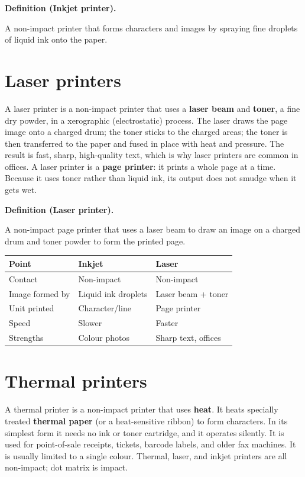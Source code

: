 \documentclass[11pt]{article}
\newenvironment{definitionbox}[1]{%
  \par\noindent\textbf{Definition (#1).}\ \itshape
}{\par\vspace{0.3em}}
\begin{document}
\begin{definitionbox}{Inkjet printer}
A non-impact printer that forms characters and images by spraying fine
droplets of liquid ink onto the paper.
\end{definitionbox}

\section{Laser printers}
A laser printer is a non-impact printer that uses a \textbf{laser beam} and
\textbf{toner}, a fine dry powder, in a xerographic (electrostatic) process.
The laser draws the page image onto a charged drum; the toner sticks to the
charged areas; the toner is then transferred to the paper and fused in place
with heat and pressure. The result is fast, sharp, high-quality text, which
is why laser printers are common in offices. A laser printer is a
\textbf{page printer}: it prints a whole page at a time. Because it uses
toner rather than liquid ink, its output does not smudge when it gets wet.

\begin{definitionbox}{Laser printer}
A non-impact page printer that uses a laser beam to draw an image on a
charged drum and toner powder to form the printed page.
\end{definitionbox}

\begin{center}
\begin{tabular}{lll}
\toprule
\textbf{Point} & \textbf{Inkjet} & \textbf{Laser} \\
\midrule
Contact & Non-impact & Non-impact \\
Image formed by & Liquid ink droplets & Laser beam + toner \\
Unit printed & Character/line & Page printer \\
Speed & Slower & Faster \\
Strengths & Colour photos & Sharp text, offices \\
\bottomrule
\end{tabular}
\end{center}

\section{Thermal printers}
A thermal printer is a non-impact printer that uses \textbf{heat}. It heats
specially treated \textbf{thermal paper} (or a heat-sensitive ribbon) to form
characters. In its simplest form it needs no ink or toner cartridge, and it
operates silently. It is used for point-of-sale receipts, tickets, barcode
labels, and older fax machines. It is usually limited to a single colour.
Thermal, laser, and inkjet printers are all non-impact; dot matrix is impact.
\end{document}
